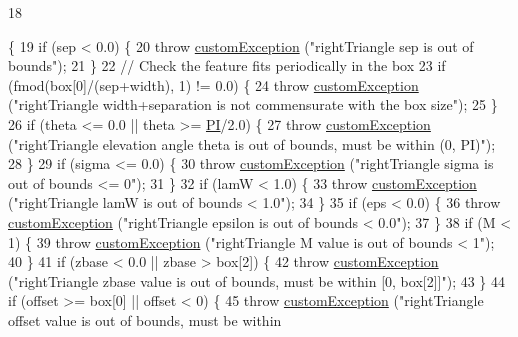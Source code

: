 \begin{DoxyCode}
18                                                                                                            
                                                                                                                  
                                   \{
19     \textcolor{keywordflow}{if} (sep < 0.0) \{
20         \textcolor{keywordflow}{throw} \hyperlink{classcustom_exception}{customException} (\textcolor{stringliteral}{"rightTriangle sep is out of bounds"});
21     \}
22     \textcolor{comment}{// Check the feature fits periodically in the box}
23     \textcolor{keywordflow}{if} (fmod(box[0]/(sep+width), 1) != 0.0) \{
24         \textcolor{keywordflow}{throw} \hyperlink{classcustom_exception}{customException} (\textcolor{stringliteral}{"rightTriangle width+separation is not commensurate with the
       box size"});
25     \}
26     \textcolor{keywordflow}{if} (theta <= 0.0 || theta >= \hyperlink{global_8h_a598a3330b3c21701223ee0ca14316eca}{PI}/2.0) \{
27         \textcolor{keywordflow}{throw} \hyperlink{classcustom_exception}{customException} (\textcolor{stringliteral}{"rightTriangle elevation angle theta is out of bounds, must
       be within (0, PI)"});
28     \}
29     \textcolor{keywordflow}{if} (sigma <= 0.0) \{
30         \textcolor{keywordflow}{throw} \hyperlink{classcustom_exception}{customException} (\textcolor{stringliteral}{"rightTriangle sigma is out of bounds <= 0"});
31     \}
32     \textcolor{keywordflow}{if} (lamW < 1.0) \{
33         \textcolor{keywordflow}{throw} \hyperlink{classcustom_exception}{customException} (\textcolor{stringliteral}{"rightTriangle lamW is out of bounds < 1.0"});
34     \}
35     \textcolor{keywordflow}{if} (eps < 0.0) \{
36         \textcolor{keywordflow}{throw} \hyperlink{classcustom_exception}{customException} (\textcolor{stringliteral}{"rightTriangle epsilon is out of bounds < 0.0"});
37     \}
38     \textcolor{keywordflow}{if} (M < 1) \{
39         \textcolor{keywordflow}{throw} \hyperlink{classcustom_exception}{customException} (\textcolor{stringliteral}{"rightTriangle M value is out of bounds < 1"});
40     \}
41     \textcolor{keywordflow}{if} (zbase < 0.0 || zbase > box[2]) \{
42         \textcolor{keywordflow}{throw} \hyperlink{classcustom_exception}{customException} (\textcolor{stringliteral}{"rightTriangle zbase value is out of bounds, must be within
       [0, box[2]]"});
43     \}
44     \textcolor{keywordflow}{if} (offset >= box[0] || offset < 0) \{
45         \textcolor{keywordflow}{throw} \hyperlink{classcustom_exception}{customException} (\textcolor{stringliteral}{"rightTriangle offset value is out of bounds, must be within
}
\end{DoxyCode}
